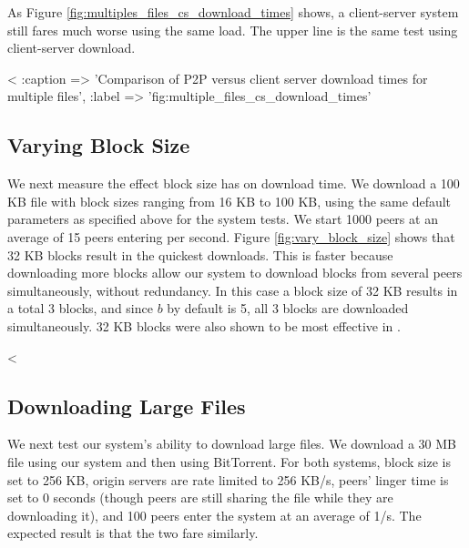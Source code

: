 As Figure \ref{fig:multiples_files_cs_download_times} shows, a client-server system still fares much worse using the same load.  The upper line is the same test using client-server download.

<%
  :caption => 'Comparison of P2P versus client server download times for multiple files', :label => 'fig:multiple_files_cs_download_times' %

\subsection{Varying Block Size}

We next measure the effect block size has on download time. We download a 100 KB file with block sizes ranging from 
16 KB to 100 KB, using the same default parameters as specified above for the system tests.
We start 1000 peers at an average of 15 peers entering per second. Figure \ref{fig:vary_block_size} shows that 32 KB blocks result
in the quickest downloads.  This is faster because downloading more blocks allow our system to download 
blocks from several peers simultaneously, without redundancy.  In this case a block size of 32 KB results in a total 3 blocks, and since $b$ by default is 5, all 3 blocks
are downloaded simultaneously. 32 KB blocks were also shown to be most effective in \cite{TODO}.  

<%

\subsection{Downloading Large Files}

We next test our system's ability to download large files. We download a 30 MB file using our system and then using BitTorrent.
For both systems, block size is set to 256 KB, origin servers are rate limited to 256 KB/s, peers' linger time 
is set to 0 seconds (though peers are still sharing the file while they are downloading it), and 100 peers enter the system at an average of 1/s.  
The expected result is that the two fare similarly. 


